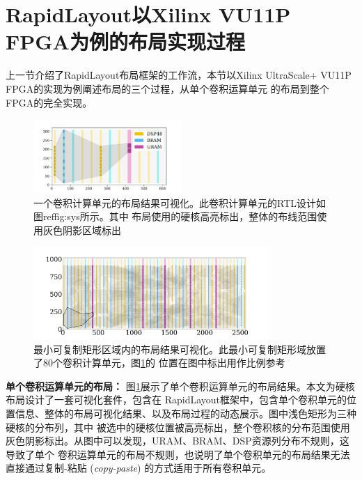\section{RapidLayout以Xilinx VU11P FPGA为例的布局实现过程}
\label{sec:visual}

上一节介绍了RapidLayout布局框架的工作流，本节以Xilinx UltraScale+ VU11P FPGA的实现为例阐述布局的三个过程，从单个卷积运算单元
的布局到整个FPGA的完全实现。


\begin{figure}
\centering
\includegraphics[width=0.5\textwidth, valign=c]{figure/block1.pdf}
\caption{一个卷积计算单元的布局结果可视化。此卷积计算单元的RTL设计如图ref{fig:sys}所示。其中
布局使用的硬核高亮标出，整体的布线范围使用灰色阴影区域标出}
\label{fig:block1}	
\end{figure}

\begin{figure}
\centering
\includegraphics[width=0.8\textwidth, valign=c]{figure/block80.pdf}
\caption{最小可复制矩形区域内的布局结果可视化。此最小可复制矩形域放置了80个卷积计算单元，图\ref{fig:block1}的
位置在图中标出用作比例参考}
\label{fig:block80}	
\end{figure}


{\bf 单个卷积运算单元的布局：} 图\ref{fig:block1}展示了单个卷积运算单元的布局结果。本文为硬核布局设计了一套可视化套件，包含在
RapidLayout框架中，包含单个卷积单元的位置信息、整体的布局可视化结果、以及布局过程的动态展示。图中浅色矩形为三种硬核的分布列，其中
被选中的硬核位置被高亮标出，整个卷积核的分布范围使用灰色阴影标出。从图中可以发现，URAM、BRAM、DSP资源列分布不规则，这导致了单个
卷积运算单元的布局不规则，也说明了单个卷积单元的布局结果无法直接通过复制-粘贴 (\textit{copy-paste}) 的方式适用于所有卷积单元。

